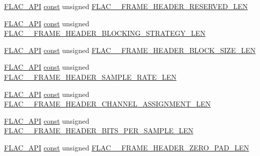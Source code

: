 \begin{DoxyCompactItemize}
\item 
\hyperlink{group__flac__export_ga56ca07df8a23310707732b1c0007d6f5}{F\+L\+A\+C\+\_\+\+A\+PI} \hyperlink{zconf_8h_a2c212835823e3c54a8ab6d95c652660e}{const} unsigned \hyperlink{group__flac__format_ga70f1f45eade9d2972370a4b35e937822}{F\+L\+A\+C\+\_\+\+\_\+\+F\+R\+A\+M\+E\+\_\+\+H\+E\+A\+D\+E\+R\+\_\+\+R\+E\+S\+E\+R\+V\+E\+D\+\_\+\+L\+EN}
\item 
\hyperlink{group__flac__export_ga56ca07df8a23310707732b1c0007d6f5}{F\+L\+A\+C\+\_\+\+A\+PI} \hyperlink{zconf_8h_a2c212835823e3c54a8ab6d95c652660e}{const} unsigned \hyperlink{group__flac__format_ga06bb43ed744b3d1c79628a8a9146c064}{F\+L\+A\+C\+\_\+\+\_\+\+F\+R\+A\+M\+E\+\_\+\+H\+E\+A\+D\+E\+R\+\_\+\+B\+L\+O\+C\+K\+I\+N\+G\+\_\+\+S\+T\+R\+A\+T\+E\+G\+Y\+\_\+\+L\+EN}
\item 
\hyperlink{group__flac__export_ga56ca07df8a23310707732b1c0007d6f5}{F\+L\+A\+C\+\_\+\+A\+PI} \hyperlink{zconf_8h_a2c212835823e3c54a8ab6d95c652660e}{const} unsigned \hyperlink{group__flac__format_ga32eacb5eab350bd660144035e2b566c8}{F\+L\+A\+C\+\_\+\+\_\+\+F\+R\+A\+M\+E\+\_\+\+H\+E\+A\+D\+E\+R\+\_\+\+B\+L\+O\+C\+K\+\_\+\+S\+I\+Z\+E\+\_\+\+L\+EN}
\item 
\hyperlink{group__flac__export_ga56ca07df8a23310707732b1c0007d6f5}{F\+L\+A\+C\+\_\+\+A\+PI} \hyperlink{zconf_8h_a2c212835823e3c54a8ab6d95c652660e}{const} unsigned \hyperlink{group__flac__format_gaff504888e04725e4f448ac297c293b76}{F\+L\+A\+C\+\_\+\+\_\+\+F\+R\+A\+M\+E\+\_\+\+H\+E\+A\+D\+E\+R\+\_\+\+S\+A\+M\+P\+L\+E\+\_\+\+R\+A\+T\+E\+\_\+\+L\+EN}
\item 
\hyperlink{group__flac__export_ga56ca07df8a23310707732b1c0007d6f5}{F\+L\+A\+C\+\_\+\+A\+PI} \hyperlink{zconf_8h_a2c212835823e3c54a8ab6d95c652660e}{const} unsigned \hyperlink{group__flac__format_ga7a0fd74605d24347c4b486d2a62825bd}{F\+L\+A\+C\+\_\+\+\_\+\+F\+R\+A\+M\+E\+\_\+\+H\+E\+A\+D\+E\+R\+\_\+\+C\+H\+A\+N\+N\+E\+L\+\_\+\+A\+S\+S\+I\+G\+N\+M\+E\+N\+T\+\_\+\+L\+EN}
\item 
\hyperlink{group__flac__export_ga56ca07df8a23310707732b1c0007d6f5}{F\+L\+A\+C\+\_\+\+A\+PI} \hyperlink{zconf_8h_a2c212835823e3c54a8ab6d95c652660e}{const} unsigned \hyperlink{group__flac__format_gae4267632e12c4d6dc514f6bf139865c7}{F\+L\+A\+C\+\_\+\+\_\+\+F\+R\+A\+M\+E\+\_\+\+H\+E\+A\+D\+E\+R\+\_\+\+B\+I\+T\+S\+\_\+\+P\+E\+R\+\_\+\+S\+A\+M\+P\+L\+E\+\_\+\+L\+EN}
\item 
\hyperlink{group__flac__export_ga56ca07df8a23310707732b1c0007d6f5}{F\+L\+A\+C\+\_\+\+A\+PI} \hyperlink{zconf_8h_a2c212835823e3c54a8ab6d95c652660e}{const} unsigned \hyperlink{group__flac__format_ga11aca6c74654d45939efafcbc3d225bf}{F\+L\+A\+C\+\_\+\+\_\+\+F\+R\+A\+M\+E\+\_\+\+H\+E\+A\+D\+E\+R\+\_\+\+Z\+E\+R\+O\+\_\+\+P\+A\+D\+\_\+\+L\+EN}

\end{DoxyCompactItemize}
